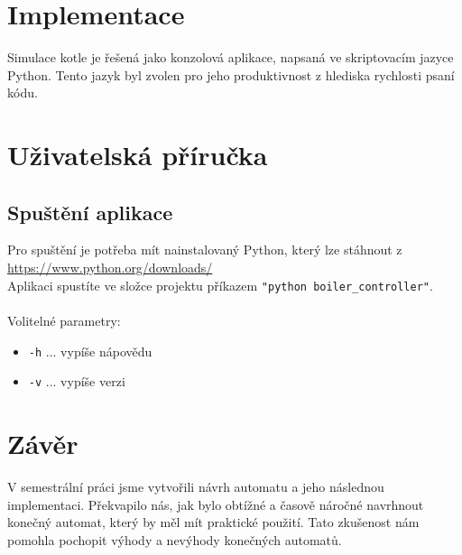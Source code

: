 \documentclass[12pt]{report}
\begin{document}
\chapter{Implementace}
Simulace kotle je řešená jako konzolová aplikace, napsaná ve skriptovacím jazyce Python. Tento jazyk byl zvolen pro jeho produktivnost z hlediska rychlosti psaní kódu.



\chapter{Uživatelská příručka}
\section{Spuštění aplikace}
Pro spuštění je potřeba mít nainstalovaný Python, který lze stáhnout z \url{https://www.python.org/downloads/}\\
Aplikaci spustíte ve složce projektu příkazem \texttt{"python boiler\_controller"}.\\
\\
Volitelné parametry:
\begin{itemize}
	\item \texttt{-h} ... vypíše nápovědu
	\item \texttt{-v} ... vypíše verzi
\end{itemize}


\chapter{Závěr}
V semestrální práci jsme vytvořili návrh automatu a jeho následnou implementaci.
Překvapilo nás, jak bylo obtížné a časově náročné navrhnout konečný automat, který by měl mít praktické použití. Tato zkušenost nám pomohla pochopit výhody a nevýhody konečných automatů.
\end{document}
